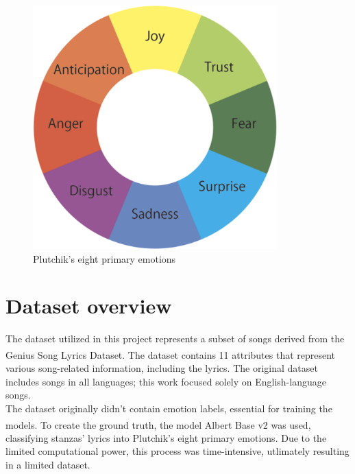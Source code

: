 \begin{figure}[H]
    \centering
    \includegraphics[scale= 0.5]{pictures/plutchik_primary_emotions.png}
    \caption{Plutchik's eight primary emotions}
    \label{fig:primary_emotions}
\end{figure}




\section*{Dataset overview}
The dataset utilized in this project represents a subset of songs
derived from the Genius Song Lyrics Dataset\textsuperscript{\cite{geniusdataset}}.
The dataset contains 11 attributes
that represent various song-related information, including the lyrics.
The original dataset includes songs in all languages; this work focused
solely on English-language songs.\\

The dataset originally didn't contain emotion labels, essential for training the models.
To create the ground truth, the model
Albert Base v2\textsuperscript{\cite{albert-base-v2}} was used, classifying
stanzas' lyrics into Plutchik's eight primary emotions.
Due to the limited computational power, this process was time-intensive,
utlimately resulting in a limited dataset.
